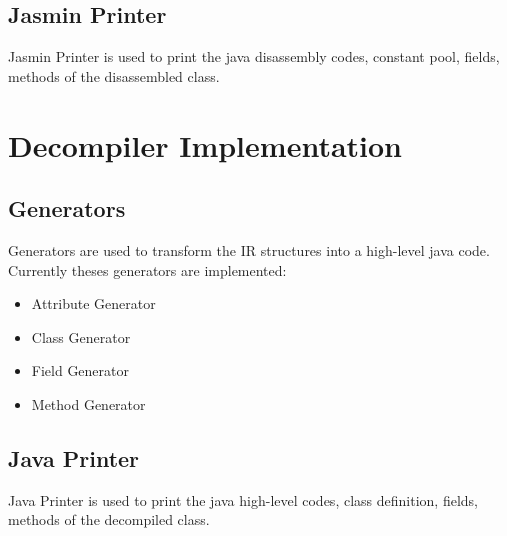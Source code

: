 \subsection{Jasmin Printer}
Jasmin Printer is used to print the java disassembly codes, constant pool, fields, methods of the disassembled class.

\section{Decompiler Implementation}

\subsection{Generators}
Generators are used to transform the IR structures into a high-level java code. Currently theses generators are implemented:

\begin{itemize}
	\itemsep-0.3em 
	\item Attribute Generator	
	\item Class Generator
	\item Field Generator
	\item Method Generator
\end{itemize}

\subsection{Java Printer}
Java Printer is used to print the java high-level codes, class definition, fields, methods of the decompiled class.

%
%
